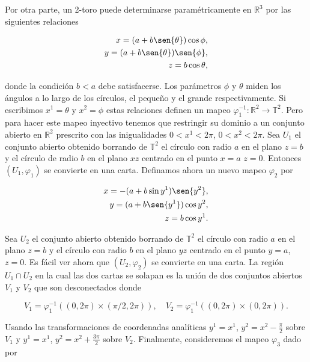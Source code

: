 \documentclass[a4paper,10pt]{article}
\numberwithin{equation}{section}
\begin{document}
\vspace{.3cm}

Por otra parte, un 2-toro puede determinarse paramétricamente en $\mathbb{R}^3$ por 
las siguientes relaciones 

\begin{align}
 x = (a+b\sen{\theta})\cos{\phi}, \\
 y = (a+b\sen{\theta})\sen{\phi}, \\
 z = b\cos{\theta},
\end{align}

donde la condición $b<a$ debe satisfacerse. Los parámetros $\phi$ y $\theta$ miden 
los ángulos a lo largo de los círculos, el pequeño y el grande respectivamente. Si 
escribimos $x^1 = \theta$ y $x^2 = \phi$ estas relaciones definen un mapeo $\varphi_1^{-1}:
\mathbb{R}^2\rightarrow \mathbb{T}^2$. Pero para hacer este mapeo inyectivo tenemos 
que restringir su dominio a un conjunto abierto en $\mathbb{R}^2$ prescrito con 
las inigualidades $0 < x^1 < 2\pi$, $0 < x^2 < 2\pi$. Sea $U_1$ el conjunto abierto
obtenido borrando de $\mathbb{T}^2$ el círculo con radio $a$ en el plano $z=b$ y 
el círculo de radio $b$ en el plano $xz$ centrado en el punto $x=a$ $z=0$. Entonces 
$(U_1,\varphi_1)$ se convierte en una carta. Definamos ahora un nuevo mapeo $\varphi_2$ 
por 

\begin{align}
 x = -(a + b\sin{y^1})\sen{y^2}, \\
 y = (a + b\sen{y^1})\cos{y^2}, \\
 z = b \cos{y^1}.
\end{align}

Sea $U_2$ el conjunto abierto obtenido borrando de $\mathbb{T}^2$ el círculo con 
radio $a$ en el plano $z=b$ y el círculo con radio $b$ en el plano $yz$ centrado 
en el punto $y=a$, $z=0$. Es fácil ver ahora que $(U_2,\varphi_2)$ se convierte en una 
carta. La región $U_1 \cap U_2$ en la cual las dos cartas se solapan es la unión 
de dos conjuntos abiertos $V_1$ y $V_2$ que son desconectados donde 

\begin{equation}
 V_1 = \varphi_1^{-1}((0,2\pi) \times (\pi/2,2\pi)), \quad 
 V_2 =  \varphi_1^{-1}((0,2\pi) \times (0,2\pi)).
\end{equation}


Usando las transformaciones de coordenadas analíticas $y^1 = x^1$, $y^2 = x^2 - \frac{\pi}{2}$ 
sobre $V_1$ y $y^1 = x^1$, $y^2 = x^2 + \frac{3\pi}{2}$ sobre $V_2$. Finalmente, 
consideremos el mapeo $\varphi_3$ dado por 
\end{document}
